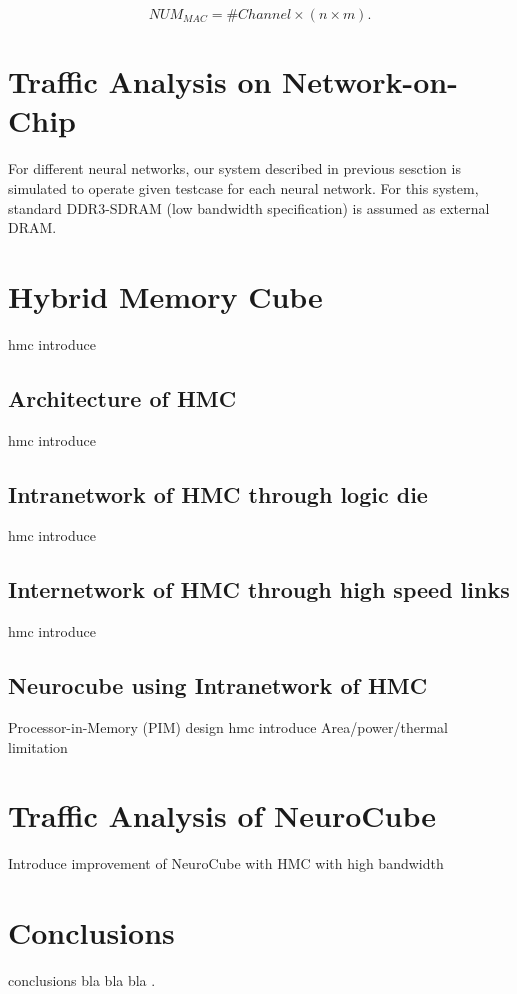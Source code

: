 \documentclass[pageno]{jpaper}
\begin{document}
\begin{equation}
	NUM_{MAC}=\#Channel\times(n\times m).
	\label{eq:num_mac}
\end{equation}











\section{Traffic Analysis on Network-on-Chip}
For different neural networks, our system described in previous sesction is simulated to operate given testcase for each neural network. For this system, standard DDR3-SDRAM (low bandwidth specification) is assumed as external DRAM.




\section{Hybrid Memory Cube}
hmc introduce
\subsection{Architecture of HMC}
hmc introduce
\subsection{Intranetwork of HMC through logic die}
hmc introduce
\subsection{Internetwork of HMC through high speed links}
hmc introduce
\subsection{Neurocube using Intranetwork of HMC}
Processor-in-Memory (PIM) design hmc introduce
Area/power/thermal limitation

\section{Traffic Analysis of NeuroCube}
Introduce improvement of NeuroCube with HMC with high bandwidth


\section{Conclusions}
conclusions 
bla bla bla \cite{basheer2000artificial}.


\clearpage
{}


\end{document}
